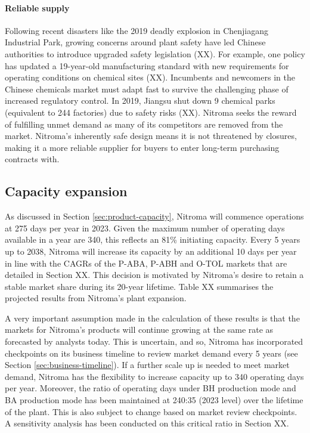 \paragraph{Reliable supply}
Following recent disasters like the 2019 deadly explosion in Chenjiagang Industrial Park, growing concerns around plant safety have led Chinese authorities to introduce upgraded safety legislation (XX). For example, one policy has updated a 19-year-old manufacturing standard with new requirements for operating conditions on chemical sites (XX). Incumbents and newcomers in the Chinese chemicals market must adapt fast to survive the challenging phase of increased regulatory control. In 2019, Jiangsu shut down 9 chemical parks (equivalent to 244 factories) due to safety risks (XX). Nitroma seeks the reward of fulfilling unmet demand as many of its competitors are removed from the market. Nitroma’s inherently safe design means it is not threatened by closures, making it a more reliable supplier for buyers to enter long-term purchasing contracts with.

\subsection{Capacity expansion}
\label{sec:expansion}
As discussed in Section \ref{sec:product-capacity}, Nitroma will commence operations at 275 days per year in 2023. Given the maximum number of operating days available in a year are 340, this reflects an 81\% initiating capacity. Every 5 years up to 2038, Nitroma will increase its capacity by an additional 10 days per year in line with the CAGRs of the P-ABA, P-ABH and O-TOL markets that are detailed in Section XX.  This decision is motivated by Nitroma’s desire to retain a stable market share during its 20-year lifetime. Table XX summarises the projected results from Nitroma’s plant expansion.

A very important assumption made in the calculation of these results is that the markets for Nitroma’s products will continue growing at the same rate as forecasted by analysts today. This is uncertain, and so, Nitroma has incorporated checkpoints on its business timeline to review market demand every 5 years (see Section \ref{sec:business-timeline}). If a further scale up is needed to meet market demand, Nitroma has the flexibility to increase capacity up to 340 operating days per year. Moreover, the ratio of operating days under BH production mode and BA production mode has been maintained at 240:35 (2023 level) over the lifetime of the plant. This is also subject to change based on market review checkpoints. A sensitivity analysis has been conducted on this critical ratio in Section XX.

